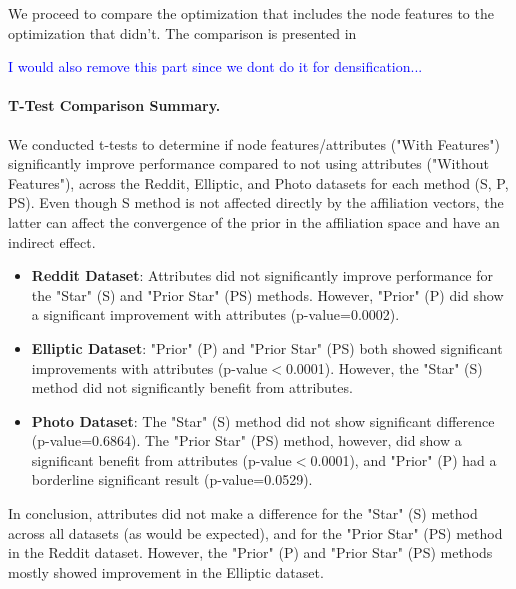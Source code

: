 \documentclass{article}
\theoremstyle{plain}
\theoremstyle{definition}
\theoremstyle{remark}
\newcommand{\dan}[1]{{{\textcolor{blue}{ {#1}\textbf{}}}}}
\begin{document}
We proceed to compare the optimization that includes the node features to the optimization that didn't. The comparison is presented in 





\dan{I would also remove this part since we dont do it for densification...}
\paragraph{T-Test Comparison Summary.}
We conducted t-tests to determine if node features/attributes ("With Features") significantly improve performance compared to not using attributes ("Without Features"), across the Reddit, Elliptic, and Photo datasets for each method (S, P, PS). Even though S method is not affected directly by the affiliation vectors, the latter can affect the convergence of the prior in the affiliation space and have an indirect effect.
\begin{itemize}
    \item \textbf{Reddit Dataset}: Attributes did not significantly improve performance for the "Star" (S) and "Prior Star" (PS) methods. However, "Prior" (P) did show a significant improvement with attributes (p-value=0.0002).
    \item \textbf{Elliptic Dataset}: "Prior" (P) and "Prior Star" (PS) both showed significant improvements with attributes (p-value$<$0.0001). However, the "Star" (S) method did not significantly benefit from attributes.
    \item \textbf{Photo Dataset}: The "Star" (S) method did not show significant difference (p-value=0.6864). The "Prior Star" (PS) method, however, did show a significant benefit from attributes (p-value$<$0.0001), and "Prior" (P) had a borderline significant result (p-value=0.0529).
\end{itemize}

In conclusion, attributes did not make a difference for the "Star" (S) method across all datasets (as would be expected), and for the "Prior Star" (PS) method in the Reddit dataset. However, the "Prior" (P) and "Prior Star" (PS) methods mostly showed improvement in the Elliptic dataset. %



\end{document}
